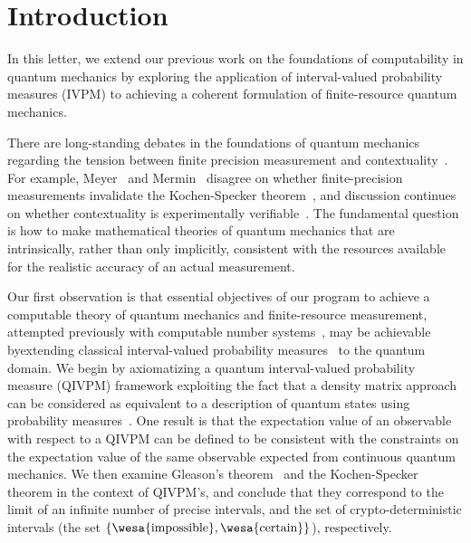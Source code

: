 \documentclass[english,reprint, aps, prl,superscriptaddress, showpacs,
showkeys, longbibliography, amsmath, amssymb]{revtex4-1}
\theoremstyle{plain}
\theoremstyle{definition}
\newcommand{\imposs}{{\text{\wesa{impossible}}}}
\newcommand{\necess}{{\text{\wesa{certain}}}}
\begin{document}
\maketitle

\section{Introduction}

In this letter, we extend our previous work on the foundations of
computability in quantum mechanics by exploring the application of
interval-valued probability measures (IVPM) to achieving a coherent
formulation of finite-resource quantum mechanics.

There are long-standing debates in the foundations of quantum
mechanics regarding the tension between finite precision measurement
and contextuality~\cite{Peres2003,BarrettKent2004}.  For example,
Meyer~\cite{PhysRevLett.83.3751} and Mermin~\cite{Mermin1999} disagree
on whether finite-precision measurements invalidate the Kochen-Specker
theorem~\cite{kochenspecker1967,peres1995quantum}, and discussion
continues on whether contextuality is experimentally
verifiable~\cite{Spekkens2005,GuehneKleinmannCabelloEtAl2010,MazurekPuseyKunjwalEtAl2016}. The
fundamental question is how to make mathematical theories of quantum
mechanics that are intrinsically, rather than only implicitly,
consistent with the resources available for the realistic accuracy of
an actual measurement.

Our first observation is that essential objectives of our program to
achieve a computable theory of quantum mechanics and finite-resource
measurement, attempted previously with computable number
systems~\cite{usat,geometry2013apsrev4,DQT2014}, may be achievable byextending classical interval-valued probability
measures~\cite{JamisonLodwick2004} to the quantum domain.  We begin by
axiomatizing a quantum interval-valued probability measure (QIVPM)
framework exploiting the fact that a density matrix approach can be
considered as equivalent to a description of quantum states using
probability
measures~\cite{10.2307/2308516,Varadarajan2008}. %
One result is that the expectation value of an observable with respect
to a QIVPM can be defined to be consistent with the constraints on the
expectation value of the same observable expected from continuous
quantum mechanics.  We then examine Gleason's
theorem~\cite{gleason1957,Redhead1987-REDINA,peres1995quantum} and the
Kochen-Specker theorem in the context of QIVPM's, and conclude
that they correspond to the limit of an infinite number of precise
intervals, and the set of crypto-deterministic intervals (the set
$\{\imposs,\necess\}$), respectively.
\end{document}
